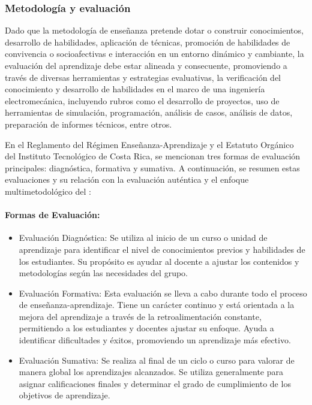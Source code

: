\subsubsection*{Metodología y evaluación}

Dado que la metodología de enseñanza pretende dotar o construir conocimientos, desarrollo de habilidades, aplicación de  técnicas, promoción de habilidades  de convivencia o socioafectivas e interacción en un entorno dinámico y cambiante, la evaluación del aprendizaje debe estar alineada y consecuente, promoviendo a través de diversas herramientas y estrategias evaluativas,  la verificación del conocimiento y desarrollo de habilidades en el marco de una ingeniería electromecánica, incluyendo rubros como el  desarrollo de proyectos, uso de  herramientas de simulación, programación, análisis de casos, análisis de datos,  preparación de informes técnicos, entre otros.\par

En el Reglamento del Régimen Enseñanza-Aprendizaje y el Estatuto Orgánico del Instituto Tecnológico de Costa Rica, se mencionan tres formas de evaluación principales: diagnóstica, formativa y sumativa. A continuación, se resumen estas evaluaciones y su relación con la evaluación auténtica y el enfoque multimetodológico del :\par

\paragraph{Formas de Evaluación:}

\begin{itemize}
\item Evaluación Diagnóstica: Se utiliza al inicio de un curso o unidad de aprendizaje para identificar el nivel de conocimientos previos y habilidades de los estudiantes. Su propósito es ayudar al docente a ajustar los contenidos y metodologías según las necesidades del grupo.
\item Evaluación Formativa: Esta evaluación se lleva a cabo durante todo el proceso de enseñanza-aprendizaje. Tiene un carácter continuo y está orientada a la mejora del aprendizaje a través de la retroalimentación constante, permitiendo a los estudiantes y docentes ajustar su enfoque. Ayuda a identificar dificultades y éxitos, promoviendo un aprendizaje más efectivo.
\item Evaluación Sumativa: Se realiza al final de un ciclo o curso para valorar de manera global los aprendizajes alcanzados. Se utiliza generalmente para asignar calificaciones finales y determinar el grado de cumplimiento de los objetivos de aprendizaje.
\end{itemize}
